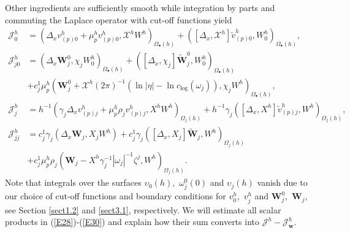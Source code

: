 \documentclass[11pt]{article}%
\numberwithin{equation}{section}
\begin{document}
Other ingredients are sufficiently smooth while integration by parts and
commuting the Laplace operator with cut-off functions yield%
\begin{align}
\mathcal{J}_{0}^{h}  &  =(\Delta_{x}v_{(p)0}^{h}+\mu_{p}^{h}v_{(p)0}%
^{h},\mathcal{X}^{h}W^{h})_{\Omega_{\bullet}(h)}+([\Delta_{x},\mathcal{X}%
^{h}]\widetilde{v}_{(p)0}^{h},W_{0}^{h})_{\Omega_{\bullet}(h)},\label{E28}\\
\mathcal{J}_{j0}^{h}  &  =(\Delta_{x}\mathbf{W}_{j}^{0},\chi_{j}W_{0}%
^{h})_{\Omega_{\bullet}(h)}+([\Delta_{x},\chi_{j}]\widetilde{\mathbf{W}}%
_{j}^{0},W_{0}^{h})_{\Omega_{\bullet}(h)}\label{E29}\\
&  +c_{j}^{1}\mu_{p}^{h}(\mathbf{W}_{j}^{0}+\mathcal{X}^{h}(2\pi)^{-1}%
(\ln|\eta|-\ln c_{\log}(\omega_{j})),\chi_{j}W^{h})_{\Omega_{\bullet}%
(h)},\nonumber\\
\mathcal{J}_{j}^{h}  &  =h^{-1}(\gamma_{j}\Delta_{x}v_{(p)j}^{h}+\mu_{p}%
^{h}\rho_{j}v_{(p)j}^{h},X^{h}W^{h})_{\Omega_{j}(h)}+h^{-1}\gamma_{j}%
([\Delta_{x},X^{h}]\widetilde{v}_{(p)j}^{h},W^{h})_{\Omega_{j}(h)}%
,\label{E30}\\
\mathcal{J}_{jj}^{h}  &  =c_{j}^{1}\gamma_{j}(\Delta_{x}\mathbf{W}_{j}%
,X_{j}W^{h})+c_{j}^{1}\gamma_{j}([\Delta_{x},X_{j}]\widetilde{\mathbf{W}}%
_{j},W^{h})_{\Omega_{j}(h)}\label{E31}\\
&  +c_{j}^{1}\mu_{p}^{h}\rho_{j}(\mathbf{W}_{j}-X^{h}\gamma_{j}^{-1}%
|\omega_{j}|^{-1}\zeta^{j},W^{h})_{\Omega_{j}(h)}.\nonumber
\end{align}
Note that integrals over the surfaces $\upsilon_{0}(h),$ $\omega_{j}^{0}(0)$
and $\upsilon_{j}(h)$ vanish due to our choice of cut-off functions and
boundary conditions for $v_{0}^{h},$ $v_{j}^{h}$ and $\mathbf{W}_{j}^{0},$
$\mathbf{W}_{j}$, see Section \ref{sect1.2} and \ref{sect3.1}, respectively.
We will estimate all scalar products in (\ref{E28})-(\ref{E30}) and explain
how their sum converts into $\mathcal{J}^{h}-\mathcal{J}_{\mathbf{w}}^{h}$.
\end{document}
